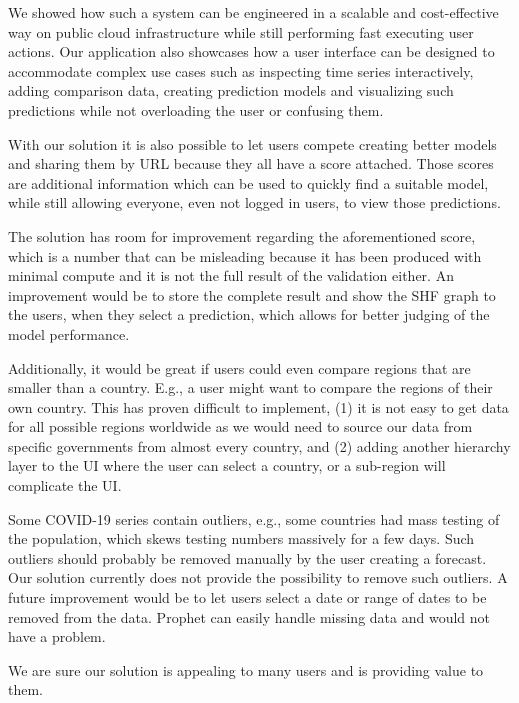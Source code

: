 \documentclass[conference]{IEEEtran}
\begin{document}
We showed how such a system can be engineered in a scalable and cost-effective way on public cloud infrastructure while still performing fast executing user actions. Our application also showcases how a user interface can be designed to accommodate complex use cases such as inspecting time series interactively, adding comparison data, creating prediction models and visualizing such predictions while not overloading the user or confusing them.

With our solution it is also possible to let users compete creating better models and sharing them by URL because they all have a score attached. Those scores are additional information which can be used to quickly find a suitable model, while still allowing everyone, even not logged in users, to view those predictions.

The solution has room for improvement regarding the aforementioned score, which is a number that can be misleading because it has been produced with minimal compute and it is not the full result of the validation either. An improvement would be to store the complete result and show the SHF graph to the users, when they select a prediction, which allows for better judging of the model performance.

Additionally, it would be great if users could even compare regions that are smaller than a country. E.g., a user might want to compare the regions of their own country. This has proven difficult to implement, (1) it is not easy to get data for all possible regions worldwide as we would need to source our data from specific governments from almost every country, and (2) adding another hierarchy layer to the UI where the user can select a country, or a sub-region will complicate the UI.

Some COVID-19 series contain outliers, e.g., some countries had mass testing of the population, which skews testing numbers massively for a few days. Such outliers should probably be removed manually by the user creating a forecast. Our solution currently does not provide the possibility to remove such outliers. A future improvement would be to let users select a date or range of dates to be removed from the data. Prophet can easily handle missing data and would not have a problem.

We are sure our solution is appealing to many users and is providing value to them.
\end{document}
